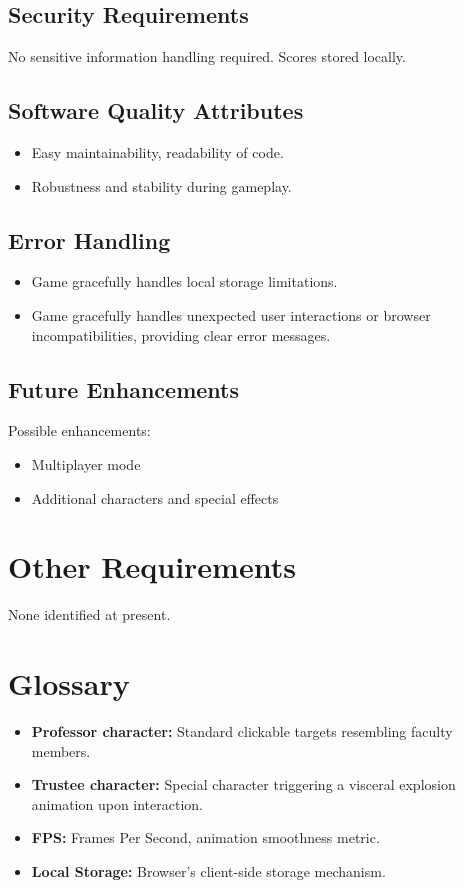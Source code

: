 \documentclass{scrreprt}
\begin{document}
\section{Security Requirements}
No sensitive information handling required. Scores stored locally.

\section{Software Quality Attributes}
\begin{itemize}
    \item Easy maintainability, readability of code.
    \item Robustness and stability during gameplay.
\end{itemize}

\section{Error Handling}
\begin{itemize}
    \item Game gracefully handles local storage limitations.
    \item Game gracefully handles unexpected user interactions or browser incompatibilities, providing clear error messages.
\end{itemize}

\section{Future Enhancements}
Possible enhancements:
\begin{itemize}
    \item Multiplayer mode
    \item Additional characters and special effects
\end{itemize}

\chapter{Other Requirements}
None identified at present.

\appendix

\chapter{Glossary}
\begin{itemize}
    \item \textbf{Professor character:} Standard clickable targets resembling faculty members.
    \item \textbf{Trustee character:} Special character triggering a visceral explosion animation upon interaction.
    \item \textbf{FPS:} Frames Per Second, animation smoothness metric.
    \item \textbf{Local Storage:} Browser's client-side storage mechanism.
\end{itemize}
\end{document}
